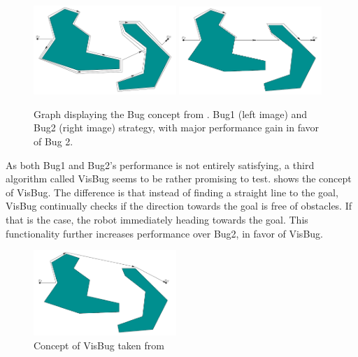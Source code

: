 \begin{figure}[h]%
\centering
\includegraphics[width=0.48\textwidth]{Bilder/Bug1.png} 
\hspace{0.2 cm}
\includegraphics[width=0.48\textwidth]{Bilder/Bug2.png} 
\caption[]{Graph displaying the Bug concept from \cite{lavalle2006planning}. Bug1 (left image) and Bug2 (right image) strategy, with major performance gain in favor of Bug 2. }
\label{Bug}
\end{figure}

As both Bug1 and Bug2's performance is not entirely satisfying, a third algorithm called VisBug seems to be rather promising to test.  shows the concept of VisBug. The difference is that instead of finding a straight line to the goal, VisBug continually checks if the direction towards the goal is free of obstacles. If that is the case, the robot immediately heading towards the goal. This functionality further increases performance over Bug2, in favor of VisBug.\\

\begin{figure}[h]%
\centering
\includegraphics[width=0.48\textwidth]{Bilder/visbug.png} 
\caption[]{Concept of VisBug taken from \cite{lavalle2006planning}}
\label{visbug}
\end{figure}

